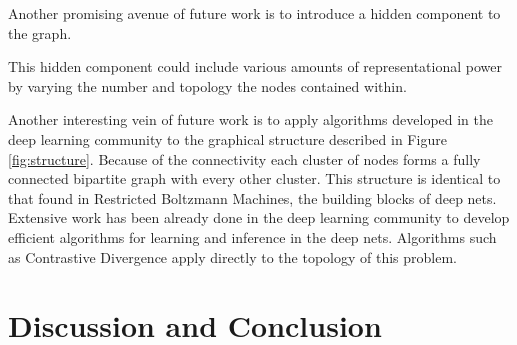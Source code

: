 \documentclass{article} %
\begin{document}
Another promising avenue of future work is to introduce a hidden component to the graph. 

This hidden component could include various amounts of representational power by varying the number and topology the nodes contained within. 

Another interesting vein of future work is to apply algorithms developed in the deep learning community to the graphical structure described in Figure \ref{fig:structure}. Because of the connectivity each cluster of nodes forms a fully connected bipartite graph with every other cluster. This structure is identical to that found in Restricted Boltzmann Machines, the building blocks of deep nets. Extensive work has been already done in the deep learning community to develop efficient algorithms for learning and inference in the deep nets. Algorithms such as Contrastive Divergence \cite{hinton02} apply directly to the topology of this problem. 

\section{Discussion and Conclusion}




\end{document}
